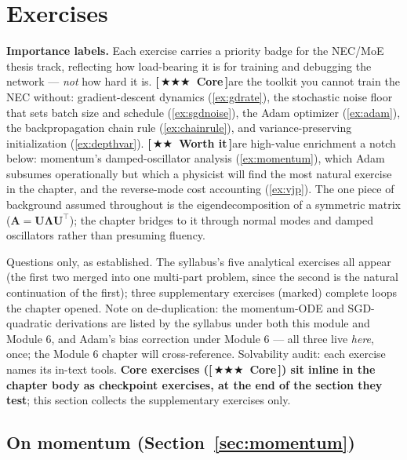 \documentclass[11pt]{article}
\numberwithin{equation}{section}
\theoremstyle{plain}
\theoremstyle{definition}
\theoremstyle{remark}
\newcounter{exercise}
\newcommand{\prioCore}{{\normalfont\small\textbf{\textcolor{necblue}{[\,\ensuremath{\bigstar\bigstar\bigstar}\ Core\,]}}}\hspace{0.5em}}
\newcommand{\prioWorth}{{\normalfont\small\textbf{\textcolor{finmaroon}{[\,\ensuremath{\bigstar\bigstar}\ Worth it\,]}}}\hspace{0.5em}}
\newcommand{\T}{\top}
\begin{document}
\section{Exercises}\label{sec:exercises}

\noindent\textbf{Importance labels.} Each exercise carries a priority badge for the NEC/MoE thesis track, reflecting how load-bearing it is for training and debugging the network --- \emph{not} how hard it is. \prioCore are the toolkit you cannot train the NEC without: gradient-descent dynamics (\ref{ex:gdrate}), the stochastic noise floor that sets batch size and schedule (\ref{ex:sgdnoise}), the Adam optimizer (\ref{ex:adam}), the backpropagation chain rule (\ref{ex:chainrule}), and variance-preserving initialization (\ref{ex:depthvar}). \prioWorth are high-value enrichment a notch below: momentum's damped-oscillator analysis (\ref{ex:momentum}), which Adam subsumes operationally but which a physicist will find the most natural exercise in the chapter, and the reverse-mode cost accounting (\ref{ex:vjp}). The one piece of background assumed throughout is the eigendecomposition of a symmetric matrix ($\bm A = \bm U\bm\Lambda\bm U^\T$); the chapter bridges to it through normal modes and damped oscillators rather than presuming fluency.

Questions only, as established. The syllabus's five analytical exercises all appear (the first two merged into one multi-part problem, since the second is the natural continuation of the first); three supplementary exercises (marked) complete loops the chapter opened. Note on de-duplication: the momentum-ODE and SGD-quadratic derivations are listed by the syllabus under both this module and Module 6, and Adam's bias correction under Module 6 --- all three live \emph{here}, once; the Module 6 chapter will cross-reference. Solvability audit: each exercise names its in-text tools. \textbf{Core exercises (\prioCore) sit inline in the chapter body as checkpoint exercises, at the end of the section they test}; this section collects the supplementary exercises only.

\subsection*{On momentum (Section~\ref{sec:momentum})}
\end{document}
